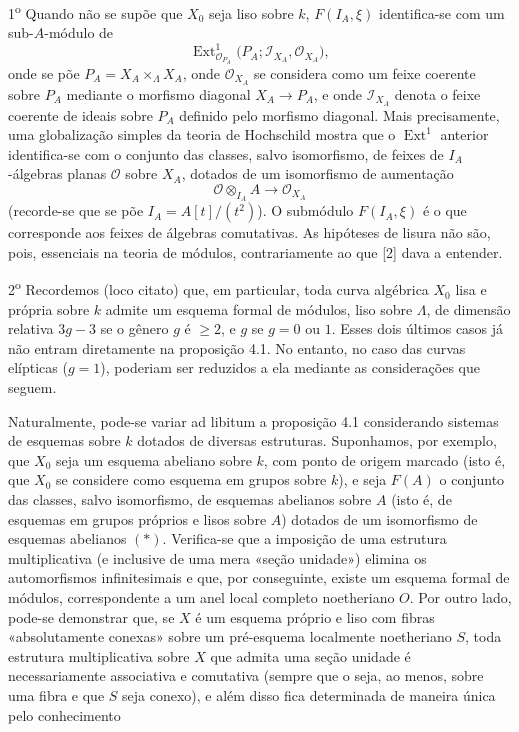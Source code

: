 1\textsuperscript{o} Quando não se supõe que $X_0$ seja
liso sobre $k$, $F(I_A,\xi)$ identifica-se com um sub-$A$-módulo de
\[
  \operatorname{Ext}^1_{\mathcal O_{P_A}}
  \bigl(P_A;\mathcal I_{X_A},\mathcal O_{X_A}\bigr),
\]
onde se põe $P_A=X_A\times_\Lambda X_A$, onde $\mathcal O_{X_A}$ se
considera como um feixe coerente sobre $P_A$ mediante o morfismo diagonal
$X_A\longrightarrow P_A$, e onde $\mathcal I_{X_A}$ denota o feixe coerente
de ideais sobre $P_A$ definido pelo morfismo diagonal. Mais precisamente,
uma globalização simples da teoria de Hochschild mostra que o
$\operatorname{Ext}^1$ anterior identifica-se com o conjunto das classes,
salvo isomorfismo, de feixes de $I_A$-álgebras planas $\mathcal O$ sobre $X_A$,
dotados de um isomorfismo de aumentação
\[
  \mathcal O\otimes_{I_A}A\longrightarrow\mathcal O_{X_A}
\]
(recorde-se que se põe $I_A=A[t]/(t^2)$). O submódulo $F(I_A,\xi)$ é o
que corresponde aos feixes de álgebras comutativas. As hipóteses de lisura
não são, pois, essenciais na teoria de módulos, contrariamente ao que [2]
dava a entender.

2\textsuperscript{o} Recordemos (loco citato) que, em particular, toda curva
algébrica $X_0$ lisa e própria sobre $k$ admite um esquema formal de módulos,
liso sobre $\Lambda$, de dimensão relativa $3g-3$ se o gênero $g$ é
$\geq2$, e $g$ se $g=0$ ou $1$. Esses dois últimos casos já não entram diretamente
na proposição 4.1. No entanto, no caso das curvas elípticas
($g=1$), poderiam ser reduzidos a ela mediante as considerações que seguem.

Naturalmente, pode-se variar ad libitum a proposição 4.1 considerando
sistemas de esquemas sobre $k$ dotados de diversas estruturas. Suponhamos,
por exemplo, que $X_0$ seja um esquema abeliano sobre $k$, com ponto de origem
marcado (isto é, que $X_0$ se considere como esquema em grupos sobre $k$), e
seja $F(A)$ o conjunto das classes, salvo isomorfismo, de esquemas abelianos
sobre $A$ (isto é, de esquemas em grupos próprios e lisos sobre $A$) dotados
de um isomorfismo de esquemas abelianos $(*)$. Verifica-se que a imposição
de uma estrutura multiplicativa (e inclusive de uma mera «seção unidade»)
elimina os automorfismos infinitesimais e que, por conseguinte, existe um
esquema formal de módulos, correspondente a um anel local completo
noetheriano $O$. Por outro lado, pode-se demonstrar que, se $X$ é um esquema
próprio e liso com fibras «absolutamente conexas» sobre um pré-esquema localmente
noetheriano $S$, toda estrutura multiplicativa sobre $X$ que admita uma
seção unidade é necessariamente associativa e comutativa (sempre que o seja,
ao menos, sobre uma fibra e que $S$ seja conexo), e além disso fica determinada de
maneira única pelo conhecimento

